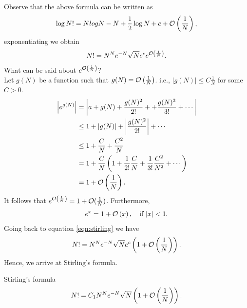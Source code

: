 \documentclass[twoside, openright, fontsize=10pt, headings=big]{scrbook}
\begin{document}
Observe that the above formula can be written as
\[
    \log N!=Nlog N-N+\frac{1}{2}\log N + c+\mathcal{O}\left(\frac{1}{N}\right),
\]
exponentiating we obtain
\begin{equation}\label{eqn:stirling}
    N!=N^Ne^{-N}\sqrt{N}e^ce^{\mathcal{O}\left(\frac{1}{N}\right)}.
\end{equation}
What can be said about $e^{\mathcal{O}\left(\frac{1}{N}\right)}$?\\
Let $g(N)$ be a function such that $g(N)=\mathcal{O}\left(\frac{1}{N}\right)$. i.e., $|g(N)|\leq C\frac{1}{N}$ for some $C>0$.
\begin{align*}
    \left|e^{g(N)}\right|&=\left|a+g(N)+\frac{g(N)^2}{2!}++\frac{g(N)^3}{3!}+\cdots\right|\\
    &\leq1+\left|g(N)\right|+\left|\frac{g(N)^2}{2!}\right|+\cdots\\
    &\leq1+\frac{C}{N}+\frac{C^2}{N}\\
    &=1+\frac{C}{N}\left(1+\frac{1}{2!}\frac{C}{N}+\frac{1}{3!}\frac{C^2}{N^2}+\cdots\right)\\
    &=1+\mathcal{O}\left(\frac{1}{N}\right).
\end{align*}
It follows that $e^{\mathcal{O}\left(\frac{1}{N}\right)}=1+\mathcal{O}(\frac{1}{N})$. Furthermore,
\[
    e^x=1+\mathcal{O}\left(x\right),\quad \text{if } |x|<1.
\]
Going back to equation \ref{eqn:stirling} we have
\[
    N!=N^Ne^{-N}\sqrt{N}e^c\left(1+\mathcal{O}\left(\frac{1}{N}\right)\right).
\]
Hence, we arrive at Stirling's formula.
\begin{corollary}{Stirling's formula}{}
    \[
        N!=C_1N^Ne^{-N}\sqrt{N}\left(1+\mathcal{O}\left(\frac{1}{N}\right)\right).
    \]   
\end{corollary}
\end{document}
